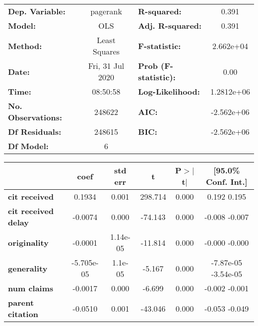 \begin{center}
\begin{tabular}{lclc}
\toprule
\textbf{Dep. Variable:}     &     pagerank     & \textbf{  R-squared:         } &       0.391     \\
\textbf{Model:}             &       OLS        & \textbf{  Adj. R-squared:    } &       0.391     \\
\textbf{Method:}            &  Least Squares   & \textbf{  F-statistic:       } &   2.662e+04     \\
\textbf{Date:}              & Fri, 31 Jul 2020 & \textbf{  Prob (F-statistic):} &       0.00      \\
\textbf{Time:}              &     08:50:58     & \textbf{  Log-Likelihood:    } &   1.2812e+06    \\
\textbf{No. Observations:}  &      248622      & \textbf{  AIC:               } &   -2.562e+06    \\
\textbf{Df Residuals:}      &      248615      & \textbf{  BIC:               } &   -2.562e+06    \\
\textbf{Df Model:}          &           6      & \textbf{                     } &                 \\
\bottomrule
\end{tabular}
\begin{tabular}{lccccc}
                            & \textbf{coef} & \textbf{std err} & \textbf{t} & \textbf{P$>$$|$t$|$} & \textbf{[95.0\% Conf. Int.]}  \\
\midrule
\textbf{cit received}       &       0.1934  &        0.001     &   298.714  &         0.000        &         0.192     0.195       \\
\textbf{cit received delay} &      -0.0074  &        0.000     &   -74.143  &         0.000        &        -0.008    -0.007       \\
\textbf{originality}        &      -0.0001  &     1.14e-05     &   -11.814  &         0.000        &        -0.000    -0.000       \\
\textbf{generality}         &   -5.705e-05  &      1.1e-05     &    -5.167  &         0.000        &     -7.87e-05 -3.54e-05       \\
\textbf{num claims}         &      -0.0017  &        0.000     &    -6.699  &         0.000        &        -0.002    -0.001       \\
\textbf{parent citation}    &      -0.0510  &        0.001     &   -43.046  &         0.000        &        -0.053    -0.049       \\

\end{tabular}
\end{center}
